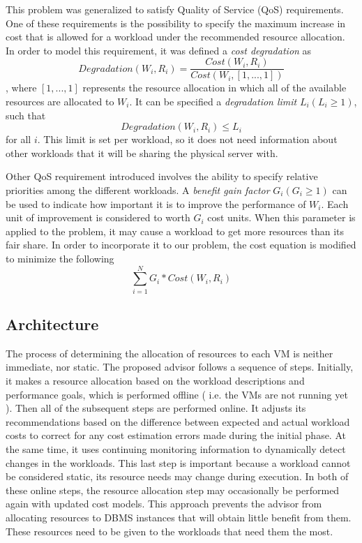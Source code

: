 This problem was generalized to satisfy Quality of Service (QoS) requirements. One of these requirements is the possibility to specify the maximum increase in cost that is allowed for a workload under the recommended resource allocation. In order to model this requirement, it was defined a \textit{cost degradation} as
\[
 Degradation(W_{i},R_{i}) = \frac{Cost(W_{i},R_{i})}{Cost(W_{i},[1,...,1])}
\]
, where $[1,...,1]$ represents the resource allocation in which all of the available resources are allocated to $W_{i}$. It can be specified a \textit{degradation limit} $L_{i} ( L_{i} \geq 1 )$, such that 
\[
 Degradation(W_{i}, R_{i}) \leq L_{i}
\]
for all $i$. This limit is set per workload, so it does not need information about other workloads that it will be sharing the physical server with.

Other QoS requirement introduced involves the ability to specify relative priorities among the different workloads. A \textit{benefit gain factor} $G_{i} (G_{i} \geq 1)$ can be used to indicate how important it is to improve the performance of $W_{i}$. Each unit of improvement is considered to worth $G_{i}$ cost units. When this parameter is applied to the problem, it may cause a workload to get more resources than its fair share. In order to incorporate it to our problem, the cost equation is modified to minimize the following
\[
  \sum_{i=1}^{N} G_{i} * Cost(W_{i},R_{i})
\]


\subsection{Architecture}

The process of  determining the allocation of resources to each VM is neither immediate, nor static. The proposed advisor follows a sequence of steps. Initially, it makes a resource allocation based on the workload descriptions and performance goals, which is performed offline ( i.e. the VMs are not running yet ). Then all of the subsequent steps are performed online. It adjusts its recommendations based on the difference between expected and actual workload costs to correct for any cost estimation errors made during the initial phase. At the same time, it uses continuing monitoring information to dynamically detect changes in the workloads. This last step is important because a workload cannot be considered static, its resource needs may change during execution. In both of these online steps, the resource allocation step may occasionally be performed again with updated cost models. This approach prevents the advisor from allocating resources to DBMS instances that will obtain little benefit from them. These 
resources need to be given to the workloads that need them the most.

